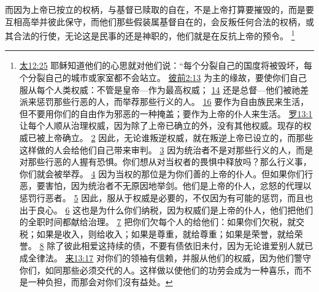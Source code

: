 \documentclass[12pt, a4paper, oneside]{ctexart}
\newcounter{parnum}[section]
\newcommand{\N}{%
   \noindent\refstepcounter{parnum}%
    \makebox[\parindent][l]{\textbf{\arabic{parnum}.}}}
\begin{document}
\N 而因为上帝已按立的权柄，与基督已赎取的自在，不是上帝打算要摧毁的，而是要互相高举并彼此保守，而他们那些假装属基督自在的，会反叛任何合法的权柄，或其合法的行使，无论这是民事的还是神职的，他们就是在反抗上帝的预令。
	\footnote {
		\href{https://biblehub.com/matthew/12-25.htm}{太12:25} 耶稣知道他们的心思就对他们说：“每个分裂自己的国度将被毁坏，每个分裂自己的城市或家室都不会站立。
		\href{https://biblehub.com/1_peter/2-13.htm}{彼前2:13} 为主的缘故，要使你们自己服从每个人类权威：不管是皇帝---作为最高权威；
		\href{https://biblehub.com/1_peter/2-14.htm}{14} 还是总督---他们被祂差派来惩罚那些行恶的人，而举荐那些行义的人。
		\href{https://biblehub.com/1_peter/2-16.htm}{16} 要作为自由族民来生活，但不要用你们的自由作为邪恶的一种掩盖；要作为上帝的仆人来生活。
		\href{https://biblehub.com/romans/13-1.htm}{罗13:1} 让每个人顺从治理权威，因为除了上帝已确立的外，没有其他权威。现存的权威已被上帝确立。
		\href{https://biblehub.com/romans/13-2.htm}{2} 因此，无论谁叛逆权威，就在叛逆上帝已设立的，而那些这样做的人会给他们自己带来审判。
		\href{https://biblehub.com/romans/13-3.htm}{3} 因为统治者不是对那些行义的人，而是对那些行恶的人握有恐惧。你们想从对当权者的畏惧中释放吗？那么行义事，你们就会被举荐。
		\href{https://biblehub.com/romans/13-4.htm}{4} 因为当权的那位是为你们善的上帝的仆人。但如果你们行恶，要害怕，因为统治者不无原因地举剑。他们是上帝的仆人，忿怒的代理以惩罚行恶者。
		\href{https://biblehub.com/romans/13-5.htm}{5} 因此，服从于权威是必要的，不仅因为有可能的惩罚，而且也出于良心。
		\href{https://biblehub.com/romans/13-6.htm}{6} 这也是为什么你们纳税，因为权威们是上帝的仆人，他们把他们的全职时间都献给治理。
		\href{https://biblehub.com/romans/13-7.htm}{7} 把你们欠每个人的给他们：如果你们欠税，就交税；如果是收入，则给收入；如果是尊重，就给尊重；如果是荣誉，就给荣誉。
		\href{https://biblehub.com/romans/13-8.htm}{8} 除了彼此相爱这持续的债，不要有债依旧未付，因为无论谁爱别人就已成全律法。
		\href{https://biblehub.com/hebrews/13-17.htm}{来13:17} 对你们的领袖有信赖，并服从他们的权威，因为他们警守你们，如同那些必须交代的人。这样做以使他们的功劳会成为一种喜乐，而不是一种负担，而那会对你们沒有益处。
	}
\end{document}
